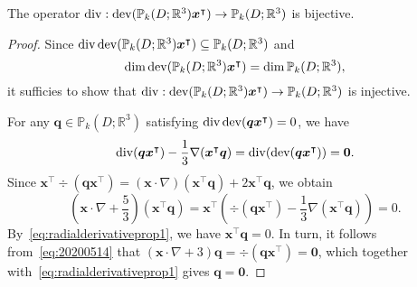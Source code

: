 \begin{lemma}\label{lem:divtracetensorsurjective}
The operator $\operatorname{div}: \operatorname{dev}(\mathbb P_{k}(D;\mathbb R^3)\boldsymbol x^{\intercal})\to \mathbb P_{k}(D;\mathbb R^3)$ is bijective.
\end{lemma}
\begin{proof}
Since $\operatorname{div}\operatorname{dev}(\mathbb P_{k}(D;\mathbb R^3)\boldsymbol x^{\intercal})\subseteq\mathbb P_{k}(D;\mathbb R^3)$ and 
$$\dim\operatorname{dev}(\mathbb P_{k}(D;\mathbb R^3)\boldsymbol x^{\intercal})=\dim\mathbb P_{k}(D;\mathbb R^3),$$
it sufficies to show that $\operatorname{div}: \operatorname{dev}(\mathbb P_{k}(D;\mathbb R^3)\boldsymbol x^{\intercal})\to \mathbb P_{k}(D;\mathbb R^3)$ is injective.

For any $\boldsymbol q\in\mathbb P_{k}(D;\mathbb R^3)$ satisfying $\operatorname{div}\operatorname{dev}(\boldsymbol q\boldsymbol x^{\intercal})=0$, we have
\begin{equation}\label{eq:20200514}
\operatorname{div}(\boldsymbol q\boldsymbol x^{\intercal})-\frac{1}{3}\nabla(\boldsymbol x^{\intercal}\boldsymbol q)=\operatorname{div}(\operatorname{dev}(\boldsymbol q\boldsymbol x^{\intercal}))=\boldsymbol 0.
\end{equation}
Since $\boldsymbol x^{\intercal}\div(\boldsymbol q\boldsymbol x^{\intercal})=(\boldsymbol x\cdot\nabla)(\boldsymbol x^{\intercal}\boldsymbol q)+2\boldsymbol x^{\intercal}\boldsymbol q$, we obtain
\[
\left(\boldsymbol x\cdot\nabla+\frac{5}{3}\right)(\boldsymbol x^{\intercal}\boldsymbol q)=\boldsymbol x^{\intercal}\left(\div(\boldsymbol q\boldsymbol x^{\intercal}) -\frac{1}{3}\nabla(\boldsymbol x^{\intercal}\boldsymbol q)\right)=0.
\]
By~\eqref{eq:radialderivativeprop1}, we have $\boldsymbol x^{\intercal}\boldsymbol q=0$. In turn, it follows from~\eqref{eq:20200514} that $(\boldsymbol x\cdot\nabla+3)\boldsymbol q=\div(\boldsymbol q\boldsymbol x^{\intercal})=\boldsymbol 0$, which together with~\eqref{eq:radialderivativeprop1} gives $\boldsymbol q=\boldsymbol 0$.
\end{proof}

